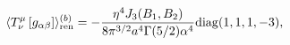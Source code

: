 \begin{equation}
\langle T_{\nu }^{\mu }\left[ g_{\alpha \beta }\right] \rangle _{{\rm ren}%
}^{(b)}=-\frac{\eta^{4}J_3(B_1,B_2)}{8\pi ^{3/2}a^{4}\Gamma (5/2)\alpha^{4}}%
{\rm diag}(1,1,1,-3),  \label{bpartemt}
\end{equation}

